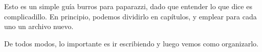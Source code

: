 Esto es un simple guía burros para paparazzi, dado que entender lo que dice es complicadillo.
En principio, podemos dividirlo en capítulos, y emplear para cada uno un archivo nuevo.

De todos modos, lo importante es ir escribiendo y luego vemos como organizarlo.